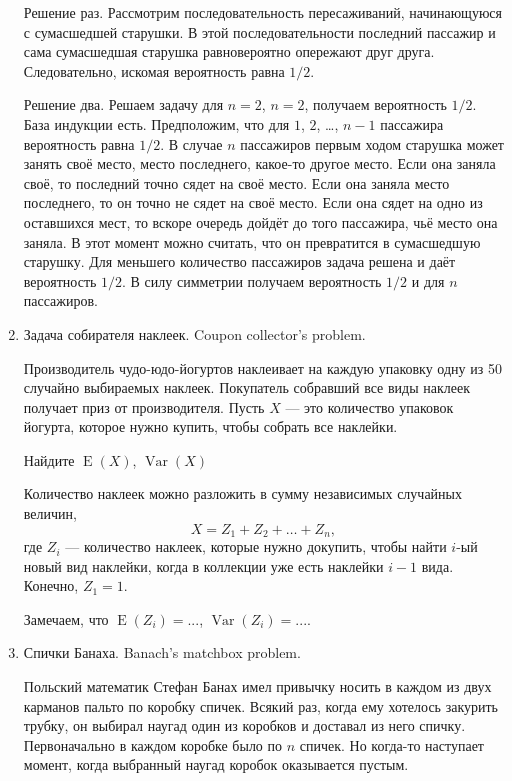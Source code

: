 \documentclass[nobib]{tufte-handout}
\DeclareMathOperator{\Var}{Var}
\DeclareMathOperator{\E}{E}
\begin{document}
\begin{enumerate}
\begin{solution}
Решение раз. Рассмотрим последовательность пересаживаний, начинающуюся с сумасшедшей старушки. В этой последовательности последний пассажир и сама сумасшедшая старушка равновероятно опережают друг друга. Следовательно, искомая вероятность равна $1/2$.

Решение два. Решаем задачу для $n=2$, $n=2$, получаем вероятность $1/2$. База индукции есть. Предположим, что для $1$, $2$, \ldots, $n-1$ пассажира вероятность равна $1/2$. В случае $n$ пассажиров первым ходом старушка может занять своё место, место последнего, какое-то другое место. Если она заняла своё, то последний точно сядет на своё место. Если она заняла место последнего, то он точно не сядет на своё место. Если она сядет на одно из оставшихся мест, то вскоре очередь дойдёт до того пассажира, чьё место она заняла. В этот момент можно считать, что он превратится в сумасшедшую старушку. Для меньшего количество пассажиров задача решена и даёт вероятность $1/2$. В силу симметрии получаем вероятность $1/2$ и для $n$ пассажиров.
\end{solution}


\item Задача собирателя наклеек. Coupon collector's problem. 

Производитель чудо-юдо-йогуртов наклеивает на каждую упаковку одну из 50 случайно выбираемых наклеек. Покупатель собравший все виды наклеек получает приз от производителя. Пусть $X$ --- это количество упаковок йогурта, которое нужно купить, чтобы собрать все наклейки.

Найдите  $\E(X)$, $\Var(X)$

\begin{solution}
Количество наклеек можно разложить в сумму независимых случайных величин,
\[
X=Z_1+Z_2+\ldots+Z_n,
\]
где $Z_i$ --- количество наклеек, которые нужно докупить, чтобы найти $i$-ый новый вид наклейки, когда в коллекции уже есть наклейки $i-1$ вида. Конечно, $Z_1=1$. 

Замечаем, что $\E(Z_i)=...$, $\Var(Z_i)=...$. 
\end{solution}

\item Спички Банаха. Banach's matchbox problem.

Польский математик Стефан Банах имел привычку носить в каждом из двух карманов пальто по коробку спичек. Всякий раз, когда ему хотелось закурить трубку, он выбирал наугад один из коробков и доставал из него спичку. Первоначально в каждом коробке было по $n$ спичек. Но когда-то наступает момент, когда выбранный наугад коробок оказывается пустым.


\end{enumerate}
\end{document}
